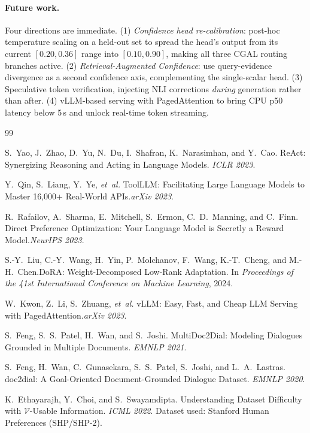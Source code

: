 \documentclass[11pt,a4paper,twocolumn]{article}
\begin{document}
\paragraph{Future work.} Four directions are immediate. (1)
\emph{Confidence head re-calibration}: post-hoc temperature scaling on
a held-out set to spread the head's output from its current
$[0.20,0.36]$ range into $[0.10,0.90]$, making all three CGAL routing
branches active. (2) \emph{Retrieval-Augmented Confidence}: use
query-evidence divergence as a second confidence axis, complementing
the single-scalar head. (3) Speculative token verification, injecting
NLI corrections \emph{during} generation rather than after.
(4) vLLM-based serving with PagedAttention to bring CPU p50 latency
below 5\,s and unlock real-time token streaming.\@

\begin{thebibliography}{99}

\sloppy

S.~Yao, J.~Zhao, D.~Yu, N.~Du, I.~Shafran, K.~Narasimhan, and Y.~Cao.
ReAct: Synergizing Reasoning and Acting in Language Models.
\emph{ICLR 2023}.

Y.~Qin, S.~Liang, Y.~Ye, \emph{et~al.}\@
ToolLLM\@: Facilitating Large Language Models to Master 16{,}000+
Real-World APIs.\@ \emph{arXiv 2023}.

R.~Rafailov, A.~Sharma, E.~Mitchell, S.~Ermon, C.~D.~Manning, and
C.~Finn. Direct Preference Optimization: Your Language Model is Secretly
a Reward Model.\@ \emph{NeurIPS 2023}.

S.-Y.~Liu, C.-Y.~Wang, H.~Yin, P.~Molchanov, F.~Wang, K.-T.~Cheng, and
M.-H.~Chen.\@ DoRA\@: Weight-Decomposed Low-Rank Adaptation.
In \emph{Proceedings of the 41st International Conference on Machine
Learning}, 2024.

W.~Kwon, Z.~Li, S.~Zhuang, \emph{et~al.}\@
vLLM\@: Easy, Fast, and Cheap LLM Serving with
PagedAttention.\@ \emph{arXiv 2023}.

S.~Feng, S.~S.~Patel, H.~Wan, and S.~Joshi.
MultiDoc2Dial: Modeling Dialogues Grounded in Multiple Documents.
\emph{EMNLP 2021}.

S.~Feng, H.~Wan, C.~Gunasekara, S.~S.~Patel, S.~Joshi, and L.~A.~Lastras.
doc2dial: A Goal-Oriented Document-Grounded Dialogue Dataset.
\emph{EMNLP 2020}.

K.~Ethayarajh, Y.~Choi, and S.~Swayamdipta.
Understanding Dataset Difficulty with $\mathcal{V}$-Usable Information.
\emph{ICML 2022}. Dataset used: Stanford Human Preferences (SHP/SHP-2).

\end{thebibliography}
\end{document}
